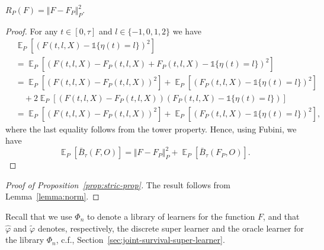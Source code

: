\documentclass[alpha-refs]{wiley-article}
\DeclareMathOperator{\E}{\mathbb{E}} %
\renewcommand{\phi}{\varphi}
\newcommand{\1}{\mathbb{1}} %
\providecommand{\DIFaddbegin}{} %
\providecommand{\DIFaddend}{} %
\providecommand{\DIFdelbegin}{} %
\providecommand{\DIFdelend}{} %
\begin{document}
\begin{lemma}
  \label{lemma:norm}
  \( R_{P}(F) = \Vert F - F_P \Vert_{P}^2 \).
\end{lemma}
\begin{proof}
  For any \( t \in [0, \tau] \) and \( l\in \{-1,0,1,2\} \) we have
  \begin{align*}
    & \E_{P}{\left[ (F(t, l, X) - \1{\{\eta(t) = l \}})^2 \right]}
    \\
    & =    \E_{P}{\left[ (F(t, l, X) - F_P(t, l, X) + F_P(t, l, X) - \1{\{\eta(t) = l
      \}})^2 \right]}
    \\
    & =    \E_{P}{\left[ (F(t, l, X) - F_P(t, l, X))^2\right]}
      + \E_{P}{\left[ (F_P(t, l, X) - \1{\{\eta(t) = l \}})^2\right]}
    \\
    & \quad
      + 2\E_{P}{\left[ (F(t, l, X) - F_P(t, l, X))(F_P(t, l, X) - \1{\{\eta(t) = l
      \}})\right]}
    \\
    & =    \E_{P}{\left[ (F(t, l, X) - F_P(t, l, X))^2\right]}
      + \E_{P}{\left[ (F_P(t, l, X) - \1{\{\eta(t) = l \}})^2\right]},
  \end{align*}
  where the last equality follows from the tower property. Hence, using Fubini,
  we have
  \begin{equation*}
    \E_P{[\bar{B}_{\tau}(F, O)]}
    = \Vert F - F_P \Vert_{P}^2 + \E_P{[\bar{B}_{\tau}(F_P, O)]}.
  \end{equation*}
\end{proof}

\DIFdelbegin %
\DIFdelend \DIFaddbegin \begin{proof}[Proof of Proposition~\ref{prop:stric-prop}]
  \DIFaddend The result follows from Lemma~\ref{lemma:norm}.
\end{proof}

Recall that we use \( \Phi_n \) to denote a library of learners for the
function \( F \), and that \( \hat{\phi} \) and \( \tilde{\phi} \) denotes,
respectively, the discrete super learner and the oracle learner for the library
\( \Phi_n \), c.f., Section~\ref{sec:joint-survival-super-learner}.
\end{document}
